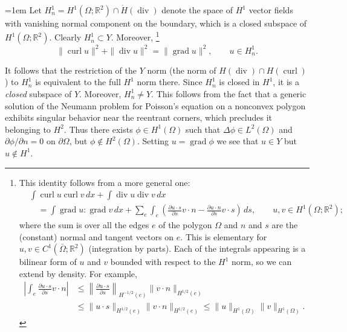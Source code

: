 \begingroup\emergencystretch=1em
{Let $H_n^1=H^1(\Omega;\mathbb R^2)\cap\mathring H(\operatorname{div})$ denote the space of $H^1$ vector fields with vanishing normal component on the boundary, which is a closed subspace of $H^1(\Omega;\mathbb R^2)$. Clearly $H_n^1\subset Y$. Moreover,}%
\footnote{{This identity follows from a more general one:}
\[
\begin{aligned}
&\int\operatorname{curl}u\operatorname{curl}v\,dx+\int\operatorname{div}u\operatorname{div}v\,dx\\
&\quad=\int\operatorname{grad}u:\operatorname{grad}v\,dx+\sum_e\int_e\left(\frac{\partial u\cdot s}{\partial s}v\cdot n-\frac{\partial u\cdot n}{\partial s}v\cdot s\right)\,ds,\qquad u,v\in H^1(\Omega;\mathbb R^2);
\end{aligned}
\]
{where the sum is over all the edges $e$ of the polygon $\Omega$ and $n$ and $s$ are the (constant) normal and tangent vectors on $e$. This is elementary for $u,v\in C^1(\bar\Omega;\mathbb R^2)$ (integration by parts). Each of the integrals appearing is a bilinear form of $u$ and $v$ bounded with respect to the $H^1$ norm, so we can extend by density. For example,}
\[
\begin{aligned}
\left|\int_e\frac{\partial u\cdot s}{\partial s}v\cdot n\right|&\leq\left\|\frac{\partial u\cdot s}{\partial s}\right\|_{H^{-1/2}(e)}\|v\cdot n\|_{H^{1/2}(e)}\\
&\leq\|u\cdot s\|_{H^{1/2}(e)}\|v\cdot n\|_{H^{1/2}(e)}\leq\|u\|_{H^1(\Omega)}\|v\|_{H^1(\Omega)}.
\end{aligned}
\]
}%
\[
\|\operatorname{curl}u\|^2+\|\operatorname{div}u\|^2=\|\operatorname{grad}u\|^2,\qquad u\in H_n^1.
\]
\par\endgroup

{It follows that the restriction of the $Y$ norm (the norm of $H(\operatorname{div})\cap H(\operatorname{curl})$) to $H_n^1$ is equivalent to the full $H^1$ norm there. Since $H_n^1$ is closed in $H^1$, it is a \emph{closed} subspace of $Y$. Moreover, $H_n^1\ne Y$. This follows from the fact that a generic solution of the Neumann problem for Poisson's equation on a nonconvex polygon exhibits singular behavior near the reentrant corners, which precludes it belonging to $H^2$. Thus there exists $\phi\in H^1(\Omega)$ such that $\Delta\phi\in L^2(\Omega)$ and $\partial\phi/\partial n=0$ on $\partial\Omega$, but $\phi\notin H^2(\Omega)$. Setting $u=\operatorname{grad}\phi$ we see that $u\in Y$ but $u\notin H^1$.}

